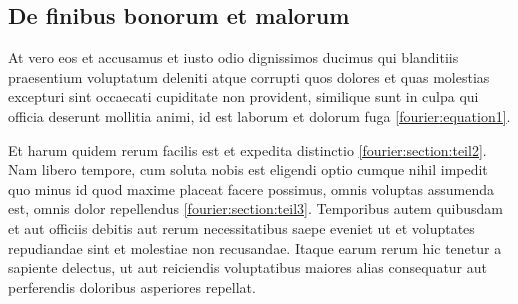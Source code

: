 \subsection{De finibus bonorum et malorum
\label{fourier:subsection:finibus}}
At vero eos et accusamus et iusto odio dignissimos ducimus qui
blanditiis praesentium voluptatum deleniti atque corrupti quos
dolores et quas molestias excepturi sint occaecati cupiditate non
provident, similique sunt in culpa qui officia deserunt mollitia
animi, id est laborum et dolorum fuga \eqref{fourier:equation1}.

Et harum quidem rerum facilis est et expedita distinctio
\ref{fourier:section:teil2}.
Nam libero tempore, cum soluta nobis est eligendi optio cumque nihil
impedit quo minus id quod maxime placeat facere possimus, omnis
voluptas assumenda est, omnis dolor repellendus
\ref{fourier:section:teil3}.
Temporibus autem quibusdam et aut officiis debitis aut rerum
necessitatibus saepe eveniet ut et voluptates repudiandae sint et
molestiae non recusandae.
Itaque earum rerum hic tenetur a sapiente delectus, ut aut reiciendis
voluptatibus maiores alias consequatur aut perferendis doloribus
asperiores repellat.


